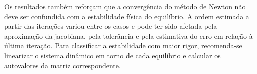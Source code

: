 \documentclass[
	12pt,				%
	oneside,			%
	a4paper,			%
	]{article}
\begin{document}
    Os resultados também reforçam que a convergência do método de Newton não deve ser confundida com a estabilidade física do equilíbrio. A ordem estimada a partir das iterações variou entre os casos e pode ter sido afetada pela aproximação da jacobiana, pela tolerância e pela estimativa do erro em relação à última iteração. Para classificar a estabilidade com maior rigor, recomenda-se linearizar o sistema dinâmico em torno de cada equilíbrio e calcular os autovalores da matriz correspondente.
\end{document}
